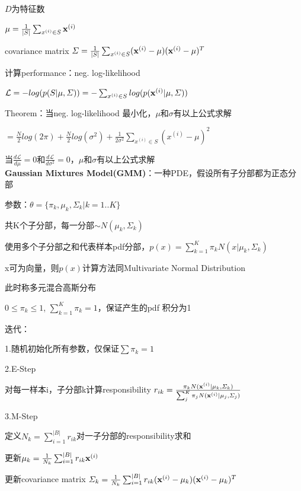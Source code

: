 \documentclass[UTF8]{ctexart}
\begin{document}
  \quad \quad \quad \quad $D$为特征数

  \quad \quad \quad \quad $\mu = \frac{1}{|S|}\sum_{x^{(i)} \in S}{\bf x}^{(i)}$

  \quad \quad \quad \quad covariance matrix $\varSigma = \frac{1}{|S|}\sum_{x^{(i)} \in S}({\bf x}^{(i)} - \mu)({\bf x}^{(i)} - \mu)^T$

  \quad \quad 计算performance：neg. log-likelihood

  \quad \quad \quad $\mathcal{L} = -log(p(S | \mu, \varSigma)) = -\sum_{x^{(i)} \in S} log(p({\bf x}^{(i)}|\mu, \varSigma))$

  \quad \quad Theorem：当neg. log-likelihood 最小化，$\mu$和$\sigma$有以上公式求解

  \quad \quad \quad \quad $= \frac{N}{2}log(2\pi) + \frac{N}{2}log(\sigma^2) + \frac{1}{2\sigma^2}\sum_{x^{(i)} \in S}(x^{(i)} - \mu)^2$

  \quad \quad \quad 当$\frac{d\mathcal{L}}{d\mu} = 0$和$\frac{d\mathcal{L}}{d\sigma^2} = 0$，$\mu$和$\sigma$有以上公式求解\\
\textbf{Gaussian Mixtures Model(GMM)}：一种PDE，假设所有子分部都为正态分部

  参数：$\theta = \{ \pi_k, \mu_k, \varSigma_k | k = 1..K\}$
  
  \quad \quad 共K个子分部，每一分部$\sim N(\mu_k, \varSigma_k)$
  
  使用多个子分部之和代表样本pdf分部，$p(x) = \sum_{k=1}^{K} \pi_kN(x|\mu_k, \varSigma_k)$

  \quad x可为向量，则$p(x)$计算方法同Multivariate Normal Distribution

  \quad \quad 此时称多元混合高斯分布
  
  \quad $0 \leq \pi_k \leq 1$, $\sum_{k=1}^{K}\pi_k = 1$，保证产生的pdf 积分为1

  迭代：

  \quad 1.随机初始化所有参数，仅保证$\sum \pi_k = 1$

  \quad 2.E-Step 

  \quad \quad 对每一样本i，子分部k计算responsibility $r_{ik} = \frac{\pi_kN({\bf x}^{(i)} | \mu_k, \varSigma_k)}{\sum_j^K\pi_jN({\bf x}^{(i)} | \mu_j, \varSigma_j)}$

  \quad 3.M-Step

  \quad \quad 定义$N_k = \sum_{i=1}^{|B|} r_{ik}$对一子分部的responsibility求和

  \quad \quad 更新$\mu_k = \frac{1}{N_k}\sum_{i=1}^{|B|}r_{ik}{\bf x}^{(i)}$

  \quad \quad 更新covariance matrix $\varSigma_k = \frac{1}{N_k}\sum_{i=1}^{|B|}r_{ik}({\bf x}^{(i)} - \mu_k)({\bf x}^{(i)} - \mu_k)^T$
\end{document}

